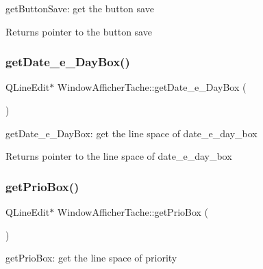get\+Button\+Save\+: get the button save 

\begin{DoxyReturn}{Returns}
pointer to the button save 
\end{DoxyReturn}
\mbox{\label{class_window_afficher_tache_ac1bfa30c803531cf3119de9dcf2169ee}} 
\subsubsection{\texorpdfstring{get\+Date\+\_\+e\+\_\+\+Day\+Box()}{getDate\_e\_DayBox()}}
{\footnotesize\ttfamily Q\+Line\+Edit$\ast$ Window\+Afficher\+Tache\+::get\+Date\+\_\+e\+\_\+\+Day\+Box (\begin{DoxyParamCaption}{ }\end{DoxyParamCaption})\hspace{0.3cm}{\ttfamily [inline]}}



get\+Date\+\_\+e\+\_\+\+Day\+Box\+: get the line space of date\+\_\+e\+\_\+day\+\_\+box 

\begin{DoxyReturn}{Returns}
pointer to the line space of date\+\_\+e\+\_\+day\+\_\+box 
\end{DoxyReturn}
\mbox{\label{class_window_afficher_tache_a2a51fbf9e0089f92bc0b96d2ac7f38a6}} 
\subsubsection{\texorpdfstring{get\+Prio\+Box()}{getPrioBox()}}
{\footnotesize\ttfamily Q\+Line\+Edit$\ast$ Window\+Afficher\+Tache\+::get\+Prio\+Box (\begin{DoxyParamCaption}{ }\end{DoxyParamCaption})\hspace{0.3cm}{\ttfamily [inline]}}



get\+Prio\+Box\+: get the line space of priority 

